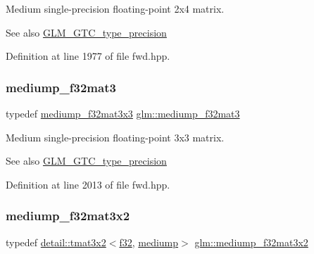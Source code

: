 Medium single-\/precision floating-\/point 2x4 matrix. \begin{DoxySeeAlso}{See also}
\hyperlink{group__gtc__type__precision}{G\+L\+M\+\_\+\+G\+T\+C\+\_\+type\+\_\+precision} 
\end{DoxySeeAlso}


Definition at line 1977 of file fwd.\+hpp.

\mbox{\label{group__gtc__type__precision_gae263a08ef179894fdd36f9a51698c4ab}} 
\subsubsection{\texorpdfstring{mediump\+\_\+f32mat3}{mediump\_f32mat3}}
{\footnotesize\ttfamily typedef \hyperlink{group__gtc__type__precision_gad4d01189a1462366b143c5cbc3de0ea9}{mediump\+\_\+f32mat3x3} \hyperlink{group__gtc__type__precision_gae263a08ef179894fdd36f9a51698c4ab}{glm\+::mediump\+\_\+f32mat3}}

Medium single-\/precision floating-\/point 3x3 matrix. \begin{DoxySeeAlso}{See also}
\hyperlink{group__gtc__type__precision}{G\+L\+M\+\_\+\+G\+T\+C\+\_\+type\+\_\+precision} 
\end{DoxySeeAlso}


Definition at line 2013 of file fwd.\+hpp.

\mbox{\label{group__gtc__type__precision_ga9762d48bb9b41e3cf40f6e616cf61b6b}} 
\subsubsection{\texorpdfstring{mediump\+\_\+f32mat3x2}{mediump\_f32mat3x2}}
{\footnotesize\ttfamily typedef \hyperlink{structglm_1_1detail_1_1tmat3x2}{detail\+::tmat3x2}$<$\hyperlink{group__gtc__type__precision_ga0ec999b57f5330d9021256e96038df04}{f32}, \hyperlink{namespaceglm_a0f04f086094c747d227af4425893f545a6416f3ea0c9025fb21ed50c4d6620482}{mediump}$>$ \hyperlink{group__gtc__type__precision_ga9762d48bb9b41e3cf40f6e616cf61b6b}{glm\+::mediump\+\_\+f32mat3x2}}

